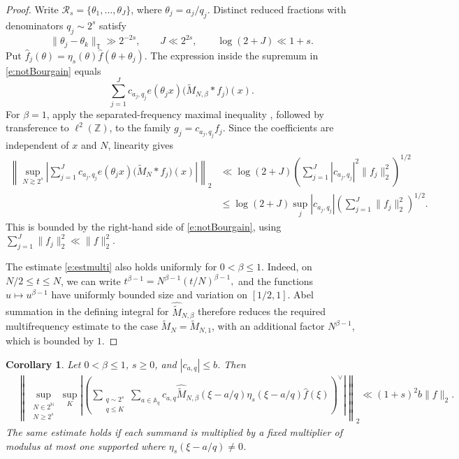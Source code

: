 \documentclass[12pt,reqno]{amsart}
\numberwithin{equation}{section}
\newtheorem{corollary}[equation]{Corollary}
\theoremstyle{definition}
\theoremstyle{remark}
\begin{document}
\begin{proof}
Write
\(\mathcal R_s=\{\theta_1,\ldots,\theta_J\}\), where
\(\theta_j=a_j/q_j\).  Distinct reduced fractions with denominators
\(q_j\sim2^s\) satisfy
\[
 \|\theta_j-\theta_k\|_{\mathbb T}\gg2^{-2s},
 \qquad
 J\ll2^{2s},
 \qquad
 \log(2+J)\ll1+s.
\]
Put $ \widehat f_j(\theta)
 =\eta_s(\theta)\widehat f(\theta+\theta_j).$ 
The expression inside the supremum in
\eqref{e:notBourgain} equals
\[
 \sum_{j=1}^J c_{a_j,q_j}e(\theta_jx)
 \bigl(\widetilde M_{N,\beta}*f_j\bigr)(x).
\]
For \(\beta=1\), apply the separated-frequency maximal inequality
\cite[Theorem~1.1]{lacey93illinois}, followed by transference to
\(\ell^2(\mathbb Z)\), to the family $ g_j=c_{a_j,q_j}f_j.$
Since the coefficients are independent of \(x\) and \(N\), linearity gives
\begin{align}\label{e:estmulti}
 \left\|\sup_{N\gtrsim2^s}
 \left|\sum_{j=1}^Jc_{a_j,q_j}e(\theta_jx)
 \bigl(\widetilde M_N*f_j\bigr)(x)\right|\right\|_2&\ll
 \log(2+J)
 \left(\sum_{j=1}^J|c_{a_j,q_j}|^2\|f_j\|_2^2\right)^{1/2}\\
 &\leq
 \log(2+J)\sup_j|c_{a_j,q_j}|
 \left(\sum_{j=1}^J\|f_j\|_2^2\right)^{1/2}.
\end{align}
This is bounded by the right-hand side of
\eqref{e:notBourgain}, using $\sum_{j=1}^J\|f_j\|_2^2\ll\|f\|_2^2.$

The estimate \eqref{e:estmulti} also holds uniformly for
\(0<\beta\leq1\).  Indeed, on \(N/2\leq t\leq N\), we can write $t^{\beta-1}=N^{\beta-1}(t/N)^{\beta-1},$
and the functions \(u\mapsto u^{\beta-1}\) have uniformly bounded size
and variation on \([1/2,1]\). Abel summation in the defining integral for
\(\widehat{\widetilde M}_{N,\beta}\) therefore reduces the required
multifrequency estimate to the case
\(\widetilde M_N=\widetilde M_{N,1}\), with an additional factor
\(N^{\beta-1}\), which is bounded by $1$.  
\end{proof}





\begin{corollary}
\label{c:orlicz-prefix}
Let \(0<\beta\leq1\), \(s\geq0\), and
\(|c_{a,q}|\leq b\).  Then
\begin{align}\label{e:orlicz-prefix}
 &\left\|
 \sup_{\substack{N\in2^{\mathbb N}\\N\geq2^s}}
 \sup_K
 \left|
 \left(
 \sum_{\substack{q\sim2^s\\q\leq K}}
 \sum_{a\in\mathbb A_q}
 c_{a,q}
 \widehat{\widetilde M}_{N,\beta}(\xi-a/q)
 \eta_s(\xi-a/q)\widehat f(\xi)
 \right)^\vee
 \right|
 \right\|_2
 \ll (1+s)^2b\|f\|_2.
\end{align}
The same estimate holds if each summand is multiplied by a fixed
multiplier of modulus at most one supported where
\(\eta_s(\xi-a/q)\neq0\).
\end{corollary}
\end{document}
